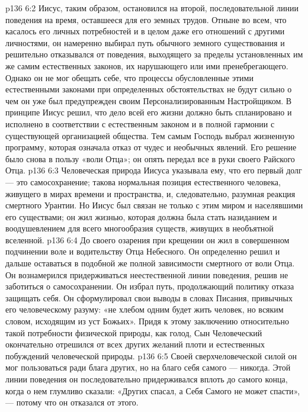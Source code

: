 \vs p136 6:2 Иисус, таким образом, остановился на второй, последовательной линии поведения на время, оставшееся для его земных трудов. Отныне во всем, что касалось его личных потребностей и в целом даже его отношений с другими личностями, он намеренно выбирал путь обычного земного существования и решительно отказывался от поведения, выходящего за пределы установленных им же самим естественных законов, их нарушающего или ими пренебрегающего. Однако он не мог обещать себе, что процессы обусловленные этими естественными законами при определенных обстоятельствах не будут сильно  о чем он уже был предупрежден своим Персонализированным Настройщиком. В принципе Иисус решил, что дело всей его жизни должно быть спланировано и исполнено в соответствии с естественным законом и в полной гармонии с существующей организацией общества. Тем самым Господь выбрал жизненную программу, которая означала отказ от чудес и необычных явлений. Его решение было снова в пользу «воли Отца»; он опять передал все в руки своего Райского Отца.
\vs p136 6:3 Человеческая природа Иисуса указывала ему, что его первый долг --- это самосохранение; такова нормальная позиция естественного человека, живущего в мирах времени и пространства, и, следовательно, разумная реакция смертного Урантии. Но Иисус был связан не только с этим миром и населявшими его существами; он жил жизнью, которая должна была стать назиданием и воодушевлением для всего многообразия существ, живущих в необъятной вселенной.
\vs p136 6:4 До своего озарения при крещении он жил в совершенном подчинении воле и водительству Отца Небесного. Он определенно решил и дальше оставаться в подобной же полной зависимости смертного от воли Отца. Он вознамерился придерживаться неестественной линии поведения, решив не заботиться о самосохранении. Он избрал путь, продолжающий политику отказа защищать себя. Он сформулировал свои выводы в словах Писания, привычных его человеческому разуму: «не хлебом одним будет жить человек, но всяким словом, исходящим из уст Божьих». Придя к этому заключению относительно такой потребности физической природы, как голод, Сын Человеческий окончательно отрешился от всех других желаний плоти и естественных побуждений человеческой природы.
\vs p136 6:5 Своей сверхчеловеческой силой он мог пользоваться ради блага других, но на благо себя самого --- никогда. Этой линии поведения он последовательно придерживался вплоть до самого конца, когда о нем глумливо сказали: «Других спасал, а Себя Самого не может спасти», --- потому что он отказался от этого.
